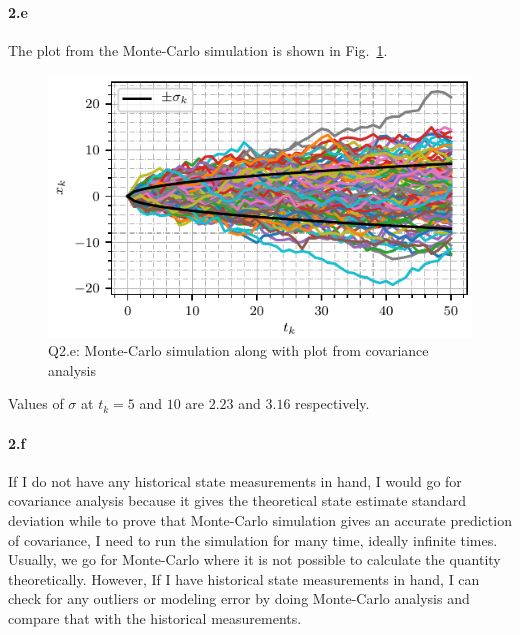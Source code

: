 \paragraph{2.e}The plot from the Monte-Carlo simulation is shown in Fig.~\ref{fig:q2_e}.
\begin{figure}[h]
	\centering
	\includegraphics[scale=1.0,trim={0cm 0cm 0cm 0cm},clip]{./code/generatedPlots/q2_e.pdf}
	\caption{Q2.e: Monte-Carlo simulation along with plot from covariance analysis}
	\label{fig:q2_e}
\end{figure}
Values of $\sigma$ at $t_k=5$ and $10$ are $2.23$ and $3.16$ respectively.
\paragraph{2.f}If I do not have any historical state measurements in hand, I would go for covariance analysis because it gives the theoretical state estimate standard deviation while to prove that Monte-Carlo simulation gives an accurate prediction of covariance, I need to run the simulation for many time, ideally infinite times. Usually, we go for Monte-Carlo where it is not possible to calculate the quantity theoretically. However, If I have historical state measurements in hand, I can check for any outliers or modeling error by doing Monte-Carlo analysis and compare that with the historical measurements.